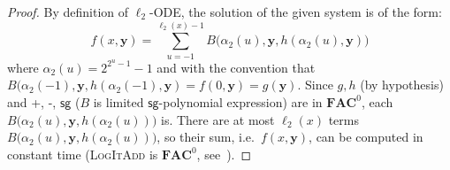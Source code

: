 \documentclass[11pt, oneside]{article}
\newcommand{\fun}[1]{\mathsf{#1}}
\newcommand{\sB}{B}
\newcommand{\AC}{\mathbf{FAC}}
\newcommand{\tu}[1]{\mathbf{#1}}
\theoremstyle{definition}
\begin{document}
{\begin{proof}
    By definition of $\ell_2$-ODE, the solution of the given system is of the form:
    $$
    f(x, \tu y) = \sum^{\ell_2(x)-1}_{u=-1} \sB\big(\alpha_2(u), \tu y, h(\alpha_2(u), \tu y)\big)
    $$
    where $\alpha_2(u)=2^{2^u-1}-1$ and with the convention that $\sB(\alpha_2(-1), \tu y, h(\alpha_2(-1), \tu y)=f(0, \tu y)= g(\tu y)$.
    Since $g, h$ (by hypothesis) and +, -, $\fun{sg}$ ($\sB$ is limited $\fun{sg}$-polynomial expression) are in $\AC^0$, each $\sB\big(\alpha_2(u), \tu y, h(\alpha_2(u))\big)$ is.
    There are at most $\ell_2(x)$ terms $\sB\big(\alpha_2(u), \tu y, h(\alpha_2(u))\big)$, so their sum, i.e.~$f(x, \tu y)$, can be computed in constant time (\textsc{LogItAdd} is $\AC^0$, see~\cite{Vollmer}). 
\end{proof}
}
\end{document}
